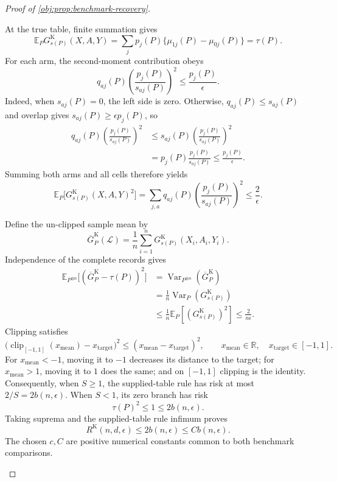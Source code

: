 \begin{proof}[Proof of \cref{obj:prop:benchmark-recovery}]
\begin{enumerate}
At the true table, finite summation gives
\[
\mathbb E_PG^{\mathrm K}_{s(P)}(X,A,Y)
=\sum_jp_j(P)\{\mu_{1j}(P)-\mu_{0j}(P)\}
=\tau(P).
\]
For each arm, the second-moment contribution obeys
\[
q_{aj}(P)\left(\frac{p_j(P)}{s_{aj}(P)}\right)^2
\le\frac{p_j(P)}{\epsilon}.
\]
Indeed, when \(s_{aj}(P)=0\), the left side is zero. Otherwise,
\(q_{aj}(P)\le s_{aj}(P)\) and overlap gives
\(s_{aj}(P)\ge\epsilon p_j(P)\), so
\[
\begin{aligned}
q_{aj}(P)\left(\frac{p_j(P)}{s_{aj}(P)}\right)^2
&\le s_{aj}(P)\left(\frac{p_j(P)}{s_{aj}(P)}\right)^2\\
&=p_j(P)\frac{p_j(P)}{s_{aj}(P)}
\le\frac{p_j(P)}{\epsilon}.
\end{aligned}
\]
Summing both arms and all cells therefore yields
\[
\mathbb E_P\bigl[G^{\mathrm K}_{s(P)}(X,A,Y)^2\bigr]
=
\sum_{j,a}q_{aj}(P)
\left(\frac{p_j(P)}{s_{aj}(P)}\right)^2
\le\frac2\epsilon.
\]

Define the un-clipped sample mean by
\[
\overline G^{\mathrm K}_P(\mathcal L)
=\frac1n\sum_{i=1}^nG^{\mathrm K}_{s(P)}(X_i,A_i,Y_i).
\]
Independence of the complete records gives
\[
\begin{aligned}
\mathbb E_{P^{\otimes n}}
\bigl[(\overline G^{\mathrm K}_P-\tau(P))^2\bigr]
&=\operatorname{Var}_{P^{\otimes n}}(\overline G^{\mathrm K}_P)\\
&=\frac1n\operatorname{Var}_P(G^{\mathrm K}_{s(P)})\\
&\le\frac1n\mathbb E_P[(G^{\mathrm K}_{s(P)})^2]
\le\frac2{n\epsilon}.
\end{aligned}
\]
Clipping satisfies
\[
\bigl(\operatorname{clip}_{[-1,1]}(x_{\mathrm{mean}})
-x_{\mathrm{target}}\bigr)^2
\le(x_{\mathrm{mean}}-x_{\mathrm{target}})^2,
\qquad
x_{\mathrm{mean}}\in\mathbb R,\quad x_{\mathrm{target}}\in[-1,1].
\]
For \(x_{\mathrm{mean}}<-1\), moving it to \(-1\) decreases its distance to the target; for \(x_{\mathrm{mean}}>1\), moving it to \(1\) does the same; and on \([-1,1]\) clipping is the identity. Consequently, when \(S\ge1\), the supplied-table rule has risk at most \(2/S=2b(n,\epsilon)\). When \(S<1\), its zero branch has risk
\[
\tau(P)^2\le1\le2b(n,\epsilon).
\]
Taking suprema and the supplied-table rule infimum proves
\[
R^{\mathrm K}(n,d,\epsilon)
\le2b(n,\epsilon)\le Cb(n,\epsilon).
\]
The chosen \(c,C\) are positive numerical constants common to both benchmark comparisons.


\end{enumerate}
\end{proof}
